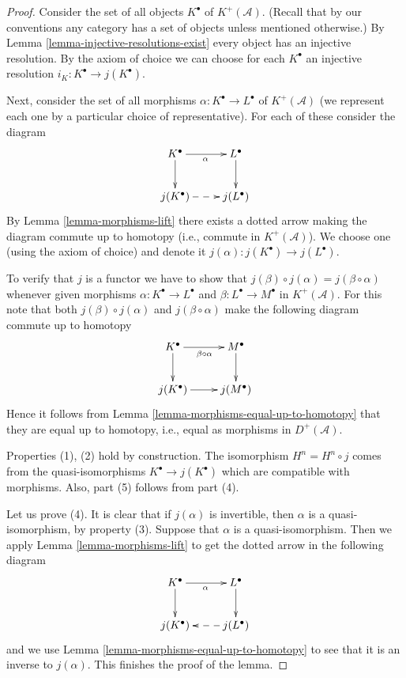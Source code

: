 \begin{proof}
Consider the set of all objects $K^\bullet$ of $K^{+}(\mathcal{A})$.
(Recall that by our conventions any category has a set of
objects unless mentioned otherwise.)
By Lemma \ref{lemma-injective-resolutions-exist} every object
has an injective resolution.
By the axiom of choice we can choose for each $K^\bullet$
an injective resolution $i_K : K^\bullet \to j(K^\bullet)$.

\medskip\noindent
Next, consider the set of all morphisms
$\alpha : K^\bullet \to L^\bullet$
of $K^{+}(\mathcal{A})$ (we represent each one by a
particular choice of representative).
For each of these consider the diagram
$$
\xymatrix{
K^\bullet \ar[d] \ar[r]_\alpha & L^\bullet \ar[d] \\
j(K^\bullet) \ar@{-->}[r] & j(L^\bullet)
}
$$
By Lemma \ref{lemma-morphisms-lift} there exists a dotted arrow
making the diagram commute up to homotopy (i.e., commute in
$K^{+}(\mathcal{A})$). We choose one (using the axiom of choice)
and denote it
$j(\alpha) : j(K^\bullet) \to j(L^\bullet)$.

\medskip\noindent
To verify that $j$ is a functor we have to show that
$j(\beta) \circ j(\alpha) = j(\beta \circ \alpha)$
whenever given morphisms $\alpha : K^\bullet \to L^\bullet$
and $\beta : L^\bullet \to M^\bullet$ in $K^{+}(\mathcal{A})$.
For this note that both
$j(\beta) \circ j(\alpha)$ and $j(\beta \circ \alpha)$
make the following diagram commute up
to homotopy
$$
\xymatrix{
K^\bullet \ar[d] \ar[r]_{\beta \circ \alpha} & M^\bullet \ar[d] \\
j(K^\bullet) \ar[r] & j(M^\bullet)
}
$$
Hence it follows from Lemma \ref{lemma-morphisms-equal-up-to-homotopy}
that they are equal up
to homotopy, i.e., equal as morphisms in $D^{+}(\mathcal{A})$.

\medskip\noindent
Properties (1), (2) hold by construction.
The isomorphism $H^n = H^n \circ j$ comes from the
quasi-isomorphisms $K^\bullet \to j(K^\bullet)$ which
are compatible with morphisms. Also, part (5) follows from part (4).

\medskip\noindent
Let us prove (4). It is clear that if $j(\alpha)$ is invertible,
then $\alpha$ is a quasi-isomorphism, by property (3).
Suppose that $\alpha$ is a quasi-isomorphism. Then we apply
Lemma \ref{lemma-morphisms-lift} to get the dotted arrow
in the following diagram
$$
\xymatrix{
K^\bullet \ar[d] \ar[r]_\alpha & L^\bullet \ar[d] \\
j(K^\bullet) & j(L^\bullet) \ar@{-->}[l]
}
$$
and we use Lemma \ref{lemma-morphisms-equal-up-to-homotopy} to see that
it is an inverse to
$j(\alpha)$. This finishes the proof of the lemma.
\end{proof}

